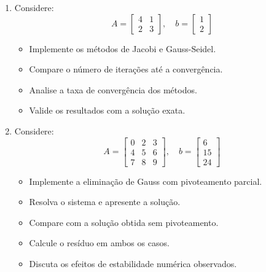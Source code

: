 \begin{enumerate}
\begin{itemize}
    \item Implemente o método de Jacobi num \textit{script}.
    \item Utilize um critério de parada baseado em $\|x^{(k+1)} - x^{(k)}\|$.
    \item Determine o número de iterações necessário para convergência.
    \item Compare com a solução obtida via \texttt{numpy.linalg.solve} do python ou similar.
\end{itemize}

\item Considere:
\[
A =
\begin{bmatrix}
4 & 1 \\
2 & 3
\end{bmatrix},
\quad
b =
\begin{bmatrix}
1 \\ 2
\end{bmatrix}
\]

\begin{itemize}
    \item Implemente os métodos de Jacobi e Gauss-Seidel.
    \item Compare o número de iterações até a convergência.
    \item Analise a taxa de convergência dos métodos.
    \item Valide os resultados com a solução exata.
\end{itemize}

\item Considere:
\[
A =
\begin{bmatrix}
0 & 2 & 3 \\
4 & 5 & 6 \\
7 & 8 & 9
\end{bmatrix},
\quad
b =
\begin{bmatrix}
6 \\ 15 \\ 24
\end{bmatrix}
\]

\begin{itemize}
    \item Implemente a eliminação de Gauss com pivoteamento parcial.
    \item Resolva o sistema e apresente a solução.
    \item Compare com a solução obtida sem pivoteamento.
    \item Calcule o resíduo em ambos os casos.
    \item Discuta os efeitos de estabilidade numérica observados.
\end{itemize}



\end{enumerate}
